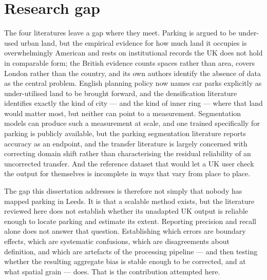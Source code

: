 \hypertarget{research-gap}{%
\section{Research gap}\label{research-gap}}

The four literatures leave a gap where they meet. Parking is argued to be under-used urban land, but the empirical evidence for how much land it occupies is overwhelmingly American and rests on institutional records the UK does not hold in comparable form; the British evidence counts spaces rather than area, covers London rather than the country, and its own authors identify the absence of data as the central problem. English planning policy now names car parks explicitly as under-utilised land to be brought forward, and the densification literature identifies exactly the kind of city --- and the kind of inner ring --- where that land would matter most, but neither can point to a measurement. Segmentation models can produce such a measurement at scale, and one trained specifically for parking is publicly available, but the parking segmentation literature reports accuracy as an endpoint, and the transfer literature is largely concerned with correcting domain shift rather than
characterising the residual reliability of an uncorrected transfer. And the reference dataset that would let a UK user check the output for themselves is incomplete in ways that vary from place to place.

The gap this dissertation addresses is therefore not simply that nobody has mapped parking in Leeds. It is that a scalable method exists, but the literature reviewed here does not establish whether its unadapted UK output is reliable enough to locate parking and estimate its extent. Reporting precision and recall alone does not answer that question. Establishing which errors are boundary effects, which are systematic confusions, which are disagreements about definition, and which are artefacts of the processing pipeline --- and then testing whether the resulting aggregate bias is stable enough to be corrected, and at what spatial grain --- does. That is the contribution attempted here.
